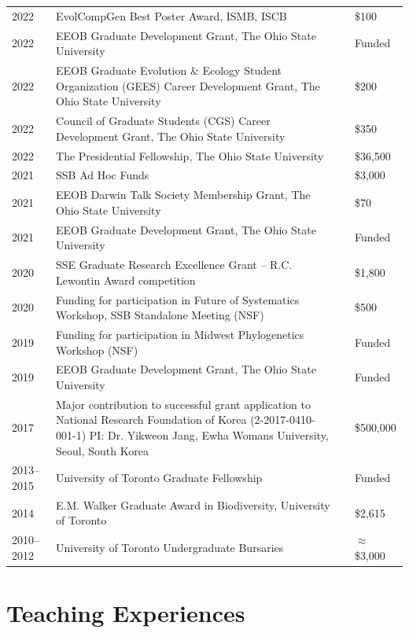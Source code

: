 \documentclass[11pt]{article}
\begin{document}
\begin{longtable}{p{}  p{} p{} p{} }%
2022 &	EvolCompGen Best Poster Award, ISMB, ISCB	& & \$100\\
2022 &	EEOB Graduate Development Grant, The Ohio State University	& & Funded\\
2022 &	EEOB Graduate Evolution \& Ecology Student Organization (GEES) Career Development Grant, The Ohio State University & & \$200\\
2022 & 	Council of Graduate Students (CGS) Career Development Grant, The Ohio State University & & \$350\\
2022 &	The Presidential Fellowship, The Ohio State University & & \$36,500\\
2021 &	SSB Ad Hoc Funds	& & \$3,000\\
2021 &	EEOB Darwin Talk Society Membership Grant, The Ohio State University	& & \$70\\
2021 &	EEOB Graduate Development Grant, The Ohio State University	& & Funded\\
2020 &	SSE Graduate Research Excellence Grant – R.C. Lewontin Award competition	& & \$1,800 \\
2020 &	Funding for participation in Future of Systematics Workshop, SSB Standalone Meeting (NSF)	& & \$500\\
2019 &	Funding for participation in Midwest Phylogenetics Workshop (NSF)	& & Funded\\
2019 &	EEOB Graduate Development Grant, The Ohio State University	& & Funded\\
2017 &	Major contribution to successful grant application to 	National Research Foundation of Korea (2-2017-0410-001-1) PI: Dr. Yikweon Jang, Ewha Womans University, Seoul, South Korea	& & \ddag\$500,000\\
2013--2015 & University of Toronto Graduate Fellowship	& & Funded\\
2014 &	E.M. Walker Graduate Award in Biodiversity, University of Toronto	& & \dag\$2,615 \\
2010--2012 &	University of Toronto Undergraduate Bursaries	& & \dag$\approx$\$3,000 \\

\end{longtable}


\hspace{0pt}



\section*{Teaching Experiences}
\end{document}
